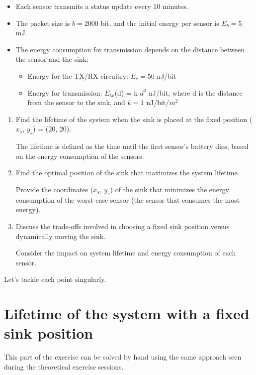 \documentclass[a4paper,11pt]{article} %
\begin{document}
    \begin{itemize}
        \item Each sensor transmits a status update every 10 minutes.
        \item The packet size is $b = 2000$ bit, and the initial energy per sensor is $E_b = 5$ mJ\@.
        \item The energy consumption for transmission depends on the distance between the sensor and the sink:
        \begin{itemize}
            \item Energy for the TX/RX circuitry: $E_c = 50$ nJ/bit
            \item Energy for transmission: $E_{tx}$(d) = k \cdot $d^2$ nJ/bit, where d is the distance from the sensor to the sink, and $k = 1$ nJ/bit/$m^2$
        \end{itemize}
    \end{itemize}

    \begin{enumerate}
        \item Find the lifetime of the system when the sink is placed at the fixed position ($x_s$, $y_s$) = (20, 20).

        The lifetime is defined as the time until the first sensor's battery dies, based on the energy consumption of the sensors.
        \item Find the optimal position of the sink that maximizes the system lifetime.

        Provide the coordinates ($x_s$, $y_s$) of the sink that minimizes the energy consumption of the worst-case sensor (the sensor that consumes the most energy).
        \item Discuss the trade-offs involved in choosing a fixed sink position versus dynamically moving the sink.

        Consider the impact on system lifetime and energy consumption of each sensor.
    \end{enumerate}

    Let's tackle each point singularly.


    \section{Lifetime of the system with a fixed sink position}\label{sec:lifetime-of-the-system-with-a-fixed-sink-position}

    This part of the exercise can be solved by hand using the same approach seen during the theoretical exercise sessions.
\end{document}
